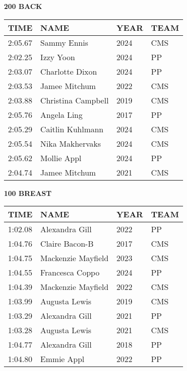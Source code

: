 \begin{table}[H]
\centering
\begin{minipage}[t]{0.48\textwidth}
\centering
\textbf{200 BACK}\\[0.1cm]
\begin{tabular}{@{}p{1.8cm}p{2.8cm}p{1.2cm}p{1.4cm}@{}}
\hline
    \textbf{TIME} & \textbf{NAME} & \textbf{YEAR} & \textbf{TEAM} \\
\hline
    2:05.67 & Sammy Ennis & 2024 & CMS \\
    2:02.25 & Izzy Yoon & 2024 & PP \\
    2:03.07 & Charlotte Dixon & 2024 & PP \\
    2:03.53 & Jamee Mitchum & 2022 & CMS \\
    2:03.88 & Christina Campbell & 2019 & CMS \\
    2:05.76 & Angela Ling & 2017 & PP \\
    2:05.29 & Caitlin Kuhlmann & 2024 & CMS \\
    2:05.54 & Nika Makhervaks & 2024 & CMS \\
    2:05.62 & Mollie Appl & 2024 & PP \\
    2:04.74 & Jamee Mitchum & 2021 & CMS \\
\hline
\end{tabular}
\end{minipage}\hfill
\begin{minipage}[t]{0.48\textwidth}
\centering
\textbf{100 BREAST}\\[0.1cm]
\begin{tabular}{@{}p{1.8cm}p{2.8cm}p{1.2cm}p{1.4cm}@{}}
\hline
    \textbf{TIME} & \textbf{NAME} & \textbf{YEAR} & \textbf{TEAM} \\
\hline
    1:02.08 & Alexandra Gill & 2022 & PP \\
    1:04.76 & Claire Bacon-B & 2017 & CMS \\
    1:04.75 & Mackenzie Mayfield & 2023 & CMS \\
    1:04.55 & Francesca Coppo & 2024 & PP \\
    1:04.39 & Mackenzie Mayfield & 2022 & CMS \\
    1:03.99 & Augusta Lewis & 2019 & CMS \\
    1:03.29 & Alexandra Gill & 2021 & PP \\
    1:03.28 & Augusta Lewis & 2021 & CMS \\
    1:04.77 & Alexandra Gill & 2018 & PP \\
    1:04.80 & Emmie Appl & 2022 & PP \\
\hline
\end{tabular}
\end{minipage}
\end{table}

